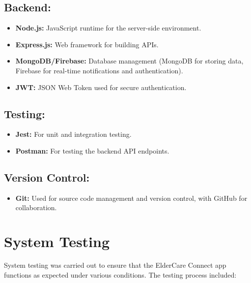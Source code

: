 \documentclass[a4paper, 12pt]{article}
\begin{document}
\subsection*{Backend:}
\begin{itemize}
    \item \textbf{Node.js:} JavaScript runtime for the server-side environment.
    \item \textbf{Express.js:} Web framework for building APIs.
    \item \textbf{MongoDB/Firebase:} Database management (MongoDB for storing data, Firebase for real-time notifications and authentication).
    \item \textbf{JWT:} JSON Web Token used for secure authentication.
\end{itemize}

\subsection*{Testing:}
\begin{itemize}
    \item \textbf{Jest:} For unit and integration testing.
    \item \textbf{Postman:} For testing the backend API endpoints.
\end{itemize}

\subsection*{Version Control:}
\begin{itemize}
    \item \textbf{Git:} Used for source code management and version control, with GitHub for collaboration.
\end{itemize}

\section{\textbf{\LARGE System Testing}}

System testing was carried out to ensure that the ElderCare Connect app functions as expected under various conditions. The testing process included:
\end{document}
